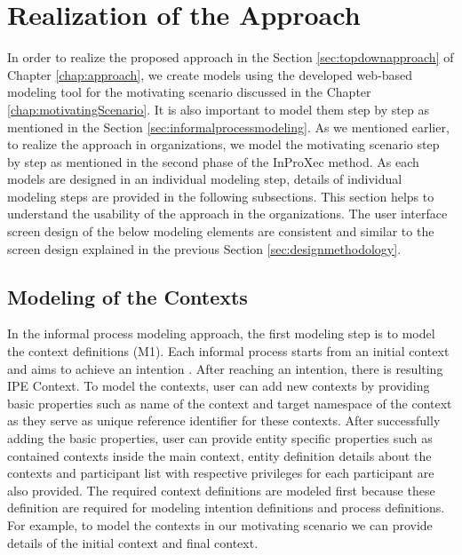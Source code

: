 \section{Realization of the Approach}
\label{sec:realization}
In order to realize the proposed approach in the Section \ref{sec:topdownapproach} of Chapter \ref{chap:approach}, we create models using the developed web-based modeling tool for the motivating scenario discussed in the Chapter \ref{chap:motivatingScenario}. It is also important to model them step by step as mentioned in the Section \ref{sec:informalprocessmodeling}. As we mentioned earlier, to realize the approach in organizations, we model the motivating scenario step by step as mentioned in the second phase of the InProXec method. As each models are designed in an individual modeling step, details of individual modeling steps are provided in the following subsections. This section helps to understand the usability of the approach in the organizations. The user interface screen design of the below modeling elements are consistent and similar to the screen design explained in the previous Section \ref{sec:designmethodology}.

\subsection{Modeling of the Contexts}
In the informal process modeling approach, the first modeling step is to model the context definitions (M1). Each informal process starts from an initial context and aims to achieve an intention \cite{Sungur2014a}. After reaching an intention, there is resulting IPE Context. To model the contexts, user can add new contexts by providing basic properties such as name of the context and target namespace of the context as they serve as unique reference identifier for these contexts. After successfully adding the basic properties, user can provide entity specific properties such as contained contexts inside the main context, entity definition details about the contexts and participant list with respective privileges for each participant are also provided. The required context definitions are modeled first because these definition are required for modeling intention definitions and process definitions. For example, to model the contexts in our motivating scenario we can provide details of the initial context and final context. 

